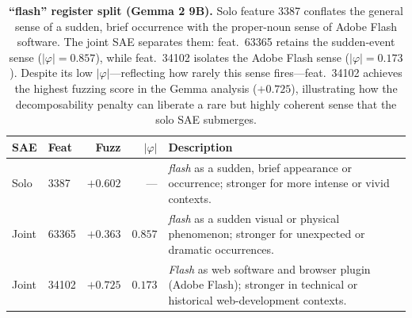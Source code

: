 \begin{table}[t]
\centering
\caption{\textbf{``flash'' register split (Gemma 2 9B).} Solo feature 3387
conflates the general sense of a sudden, brief occurrence with the proper-noun
sense of Adobe Flash software.  The joint SAE separates them: feat.\ 63365
retains the sudden-event sense ($|\varphi|\!=\!0.857$), while feat.\ 34102
isolates the Adobe Flash sense ($|\varphi|\!=\!0.173$).  Despite its low
$|\varphi|$---reflecting how rarely this sense fires---feat.\ 34102 achieves
the highest fuzzing score in the Gemma analysis ($+0.725$), illustrating how
the decomposability penalty can liberate a rare but highly coherent sense
that the solo SAE submerges.}
\label{tab:qual_flash}
\small
\begin{tabular}{llrrl}
\toprule
SAE & Feat & Fuzz & $|\varphi|$ & Description \\
\midrule
Solo & 3387 & $+0.602$ & — &
  \textit{flash} as a sudden, brief appearance or occurrence;
  stronger for more intense or vivid contexts. \\[4pt]
\midrule
Joint & 63365 & $+0.363$ & $0.857$ &
  \textit{flash} as a sudden visual or physical phenomenon;
  stronger for unexpected or dramatic occurrences. \\[3pt]
Joint & 34102 & $+0.725$ & $0.173$ &
  \textit{Flash} as web software and browser plugin (Adobe Flash);
  stronger in technical or historical web-development contexts. \\
\bottomrule
\end{tabular}
\end{table}
